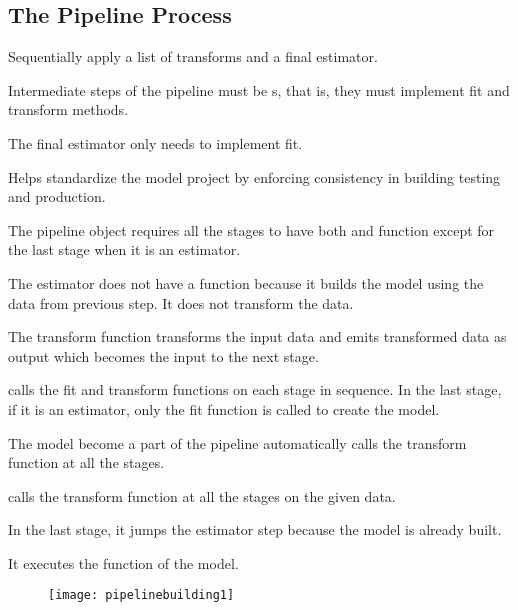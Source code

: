 	\subsection{The Pipeline Process}
	\begin{numberedlist}
		\item Sequentially apply a list of transforms and a final estimator.
		\item Intermediate steps of the pipeline must be s, that is, they must implement fit and transform methods.
		\item The final estimator only needs to implement fit.
		\item Helps standardize the model project by enforcing consistency in building testing and production.
	\end{numberedlist}

	\begin{bulletedlist}
		\item The pipeline object requires all the stages to have both  and  function except for the last stage when it is an estimator.
		\item The estimator does not have a  function because it builds the model using the data from previous step. It does not transform the data.
		\item The transform function transforms the input data and emits transformed data as output which becomes the input to the next stage.
		\item {} calls the fit and transform functions on each stage in sequence. In the last stage, if it is an estimator, only the fit function is called to create the model.
		\item The model become a part of the pipeline automatically  calls the transform function at all the stages.
		\item {} calls the transform function at all the stages on the given data.
		\item In the last stage, it jumps the estimator step because the model is already built.
		\item It executes the  function of the model.
	\end{bulletedlist}

	\begin{figure}[tbh]
		\centering
		\texttt{[image: pipelinebuilding1]}
		\caption{}
		\label{fig:pipelinebuilding1}
	\end{figure}

